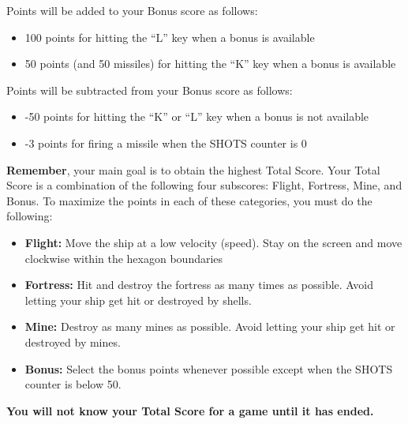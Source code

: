 \documentclass[letterpaper,12pt]{article}
\begin{document}
\noindent
Points will be added to your Bonus score as follows:
\begin{itemize}
\item 100 points for hitting the ``L'' key when a bonus is available
\item 50 points (and 50 missiles) for hitting the ``K'' key when a bonus is available
\end{itemize}

\noindent
Points will be subtracted from your Bonus score as follows:
\begin{itemize}
\item -50 points for hitting the ``K'' or ``L'' key when a bonus is not available
\item -3 points for firing a missile when the SHOTS counter is 0
\end{itemize}

\noindent
\textbf{Remember}, your main goal is to obtain the highest Total Score. Your Total Score is a
combination of the following four subscores: Flight, Fortress, Mine, and Bonus. To maximize the
points in each of these categories, you must do the following:

\begin{itemize}
\item \textbf{Flight:} Move the ship at a low velocity (speed). Stay on the screen and move
clockwise within the hexagon boundaries
\item \textbf{Fortress:} Hit and destroy the fortress as many times as possible. Avoid letting your
ship get hit or destroyed by shells.
\item \textbf{Mine:} Destroy as many mines as possible. Avoid letting your ship get hit or destroyed
by mines.
\item \textbf{Bonus:} Select the bonus points whenever possible except when the SHOTS counter is
below 50.
\end{itemize}

\begin{center}
\textbf{You will not know your Total Score for a game until it has ended.}
\end{center}
\end{document}
